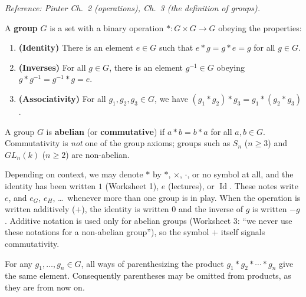 \documentclass[11pt]{report}
\begin{document}
\textit{Reference: Pinter Ch.\ 2 (operations), Ch.\ 3 (the definition of groups).}

\begin{defbox}[Group]\label{def:group}
A \textbf{group} $G$ is a set with a binary operation $*: G \times G \to G$ obeying the properties:
\begin{enumerate}
    \item \textbf{(Identity)} There is an element $e \in G$ such that $e * g = g * e = g$ for all $g \in G$.
    \item \textbf{(Inverses)} For all $g \in G$, there is an element $g^{-1} \in G$ obeying $g * g^{-1} = g^{-1} * g = e$.
    \item \textbf{(Associativity)} For all $g_1, g_2, g_3 \in G$, we have $(g_1 * g_2) * g_3 = g_1 * (g_2 * g_3)$.
\end{enumerate}
\end{defbox}

\begin{defbox}\label{def:abelian-group}
A group $G$ is \textbf{abelian} (or \textbf{commutative}) if $a * b = b * a$ for all $a, b \in G$. Commutativity is \emph{not} one of the group axioms; groups such as $S_n$ ($n \geq 3$) and $GL_n(k)$ ($n \geq 2$) are non-abelian.
\end{defbox}

\begin{rembox}[Notation]\label{rem:notation}
Depending on context, we may denote $*$ by $*$, $\times$, $\cdot$, or no symbol at all, and the identity has been written $1$ (Worksheet 1), $e$ (lectures), or $\operatorname{Id}$. These notes write $e$, and $e_G$, $e_H$, \ldots\ whenever more than one group is in play. When the operation is written additively ($+$), the identity is written $0$ and the inverse of $g$ is written $-g$. Additive notation is used only for abelian groups (Worksheet 3: ``we never use these notations for a non-abelian group''), so the symbol $+$ itself signals commutativity.
\end{rembox}

\begin{propbox}\label{prop:generalized-associativity}
For any $g_1, \ldots, g_n \in G$, all ways of parenthesizing the product $g_1 * g_2 * \cdots * g_n$ give the same element. Consequently parentheses may be omitted from products, as they are from now on.
\end{propbox}
\end{document}
